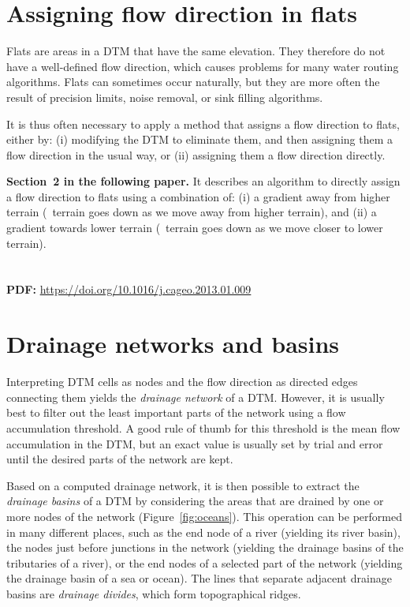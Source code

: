 \section[Flow direction in flats]{Assigning flow direction in flats}

Flats are areas in a DTM that have the same elevation.
They therefore do not have a well-defined flow direction, which causes problems for many water routing algorithms.
Flats can sometimes occur naturally, but they are more often the result of precision limits, noise removal, or sink filling algorithms.

It is thus often necessary to apply a method that assigns a flow direction to flats, either by: (i) modifying the DTM to eliminate them, and then assigning them a flow direction in the usual way, or (ii) assigning them a flow direction directly.

\begin{kaobox}[frametitle=\faExternalLink\ To read or to watch.]
\textbf{Section~2 in the following paper.} 
It describes an algorithm to directly assign a flow direction to flats using a combination of: (i) a gradient away from higher terrain (\ie\ terrain goes down as we move away from higher terrain), and (ii) a gradient towards lower terrain (\ie\ terrain goes down as we move closer to lower terrain).
\\
\\
\\
\textbf{PDF:} \url{https://doi.org/10.1016/j.cageo.2013.01.009}
\end{kaobox}

\section{Drainage networks and basins}

Interpreting DTM cells as nodes and the flow direction as directed edges connecting them yields the \emph{drainage network} of a DTM\@.
However, it is usually best to filter out the least important parts of the network using a flow accumulation threshold.
A good rule of thumb for this threshold is the mean flow accumulation in the DTM, but an exact value is usually set by trial and error until the desired parts of the network are kept.

Based on a computed drainage network, it is then possible to extract the \emph{drainage basins} of a DTM by considering the areas that are drained by one or more nodes of the network (Figure~\ref{fig:oceans}).
This operation can be performed in many different places, such as the end node of a river (yielding its river basin), the nodes just before junctions in the network (yielding the drainage basins of the tributaries of a river), or the end nodes of a selected part of the network (yielding the drainage basin of a sea or ocean).
The lines that separate adjacent drainage basins are \emph{drainage divides}, which form topographical ridges.

